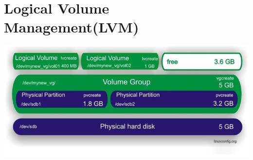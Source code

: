 \documentclass[letterpaper,10pt,english]{sphinxmanual}
\begin{document}
\section{Logical Volume Management(LVM)}
\label{_source/things/lvm::doc}\label{_source/things/lvm:logical-volume-management-lvm}
\includegraphics{lvm.jpg}
\end{document}
